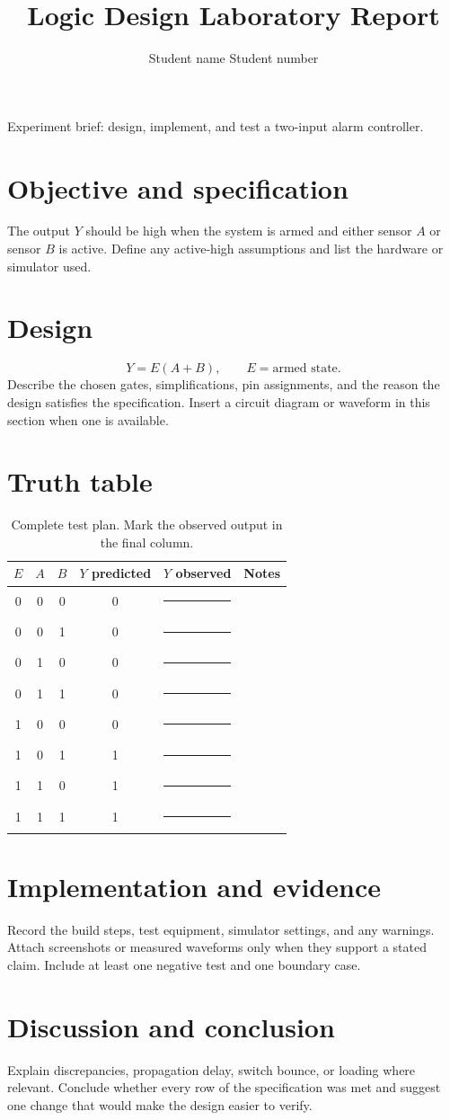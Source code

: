 \documentclass[11pt]{article}
\title{Logic Design Laboratory Report}
\author{Student name \quad Student number}
\date{Experiment date: \rule{0.2\linewidth}{0.4pt}}
\begin{document}
\maketitle
\noindent\colorbox{labblue}{\parbox{\dimexpr\linewidth-2\fboxsep}{\color{white}
Experiment brief: design, implement, and test a two-input alarm controller.}}

\section{Objective and specification}
The output $Y$ should be high when the system is armed and either sensor $A$ or
sensor $B$ is active. Define any active-high assumptions and list the hardware
or simulator used.

\section{Design}
\[
  Y = E(A+B), \qquad E=\text{armed state}.
\]
Describe the chosen gates, simplifications, pin assignments, and the reason
the design satisfies the specification. Insert a circuit diagram or waveform
in this section when one is available.

\section{Truth table}
\begin{table}[ht]
\centering
\caption{Complete test plan. Mark the observed output in the final column.}
\begin{tabular}{@{}cccccc@{}}
\toprule
$E$ & $A$ & $B$ & $Y$ predicted & $Y$ observed & Notes\\
\midrule
0&0&0&0&\rule{1.4cm}{0.4pt}&\\
0&0&1&0&\rule{1.4cm}{0.4pt}&\\
0&1&0&0&\rule{1.4cm}{0.4pt}&\\
0&1&1&0&\rule{1.4cm}{0.4pt}&\\
1&0&0&0&\rule{1.4cm}{0.4pt}&\\
1&0&1&1&\rule{1.4cm}{0.4pt}&\\
1&1&0&1&\rule{1.4cm}{0.4pt}&\\
1&1&1&1&\rule{1.4cm}{0.4pt}&\\
\bottomrule
\end{tabular}
\end{table}

\section{Implementation and evidence}
Record the build steps, test equipment, simulator settings, and any warnings.
Attach screenshots or measured waveforms only when they support a stated
claim. Include at least one negative test and one boundary case.

\section{Discussion and conclusion}
Explain discrepancies, propagation delay, switch bounce, or loading where
relevant. Conclude whether every row of the specification was met and suggest
one change that would make the design easier to verify.
\end{document}
